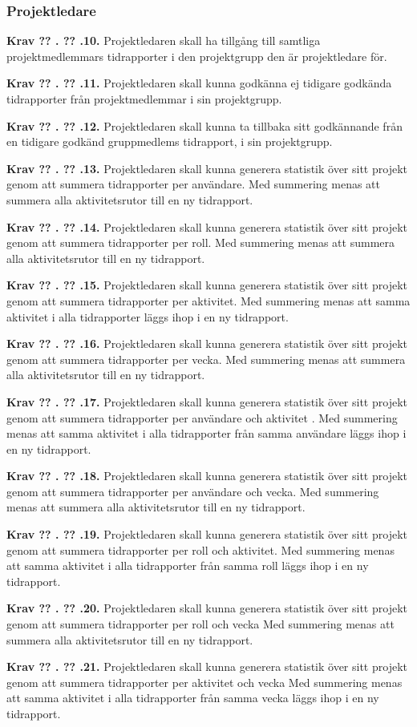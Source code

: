 \documentclass[a4paper]{article}
\newcommand\getcurrentref[1]{%
 \ifnumequal{\value{#1}}{0}
  {??}
  {\the\value{#1}}%
}
\newcommand\requirement[2]{
	\numberedrow{Krav}{#1}{#2}
}
\newcommand\numberedrow[3]{
	\noindent
	\textbf{#1 \getcurrentref{section}.\getcurrentref{subsection}.#2.} #3
	
}
\begin{document}
		\subsubsection*{Projektledare}
			\requirement{10}{Projektledaren skall ha tillgång till samtliga projektmedlemmars tidrapporter i den projektgrupp den är projektledare för.}
			\requirement{11}{Projektledaren skall kunna godkänna ej tidigare godkända tidrapporter från projektmedlemmar i sin projektgrupp.}
			\requirement{12}{Projektledaren skall kunna ta tillbaka sitt godkännande från en tidigare godkänd gruppmedlems tidrapport, i sin projektgrupp.}
			\requirement{13}{Projektledaren skall kunna generera statistik över sitt projekt genom att summera tidrapporter per användare. Med summering menas att summera alla aktivitetsrutor till en ny tidrapport.}
			\requirement{14}{Projektledaren skall kunna generera statistik över sitt projekt genom att summera tidrapporter per roll. Med summering menas att summera alla aktivitetsrutor till en ny tidrapport.}
			\requirement{15}{Projektledaren skall kunna generera statistik över sitt projekt genom att summera tidrapporter per aktivitet. Med summering menas att samma aktivitet i alla tidrapporter läggs ihop i en ny tidrapport.}
			\requirement{16}{Projektledaren skall kunna generera statistik över sitt projekt genom att summera tidrapporter per vecka. Med summering menas att summera alla aktivitetsrutor till en ny tidrapport.}
			\requirement{17}{Projektledaren skall kunna generera statistik över sitt projekt genom att summera tidrapporter per användare och aktivitet . Med summering menas att samma aktivitet i alla tidrapporter från samma användare läggs ihop i en ny tidrapport.}
			\requirement{18}{Projektledaren skall kunna generera statistik över sitt projekt genom att summera tidrapporter per användare och vecka. Med summering menas att summera alla aktivitetsrutor till en ny tidrapport.}
			\requirement{19}{Projektledaren skall kunna generera statistik över sitt projekt genom att summera tidrapporter per roll och aktivitet. Med summering menas att samma aktivitet i alla tidrapporter från samma roll läggs ihop i en ny tidrapport.}
			\requirement{20}{Projektledaren skall kunna generera statistik över sitt projekt genom att summera tidrapporter per roll och vecka Med summering menas att summera alla aktivitetsrutor till en ny tidrapport.}
			\requirement{21}{Projektledaren skall kunna generera statistik över sitt projekt genom att summera tidrapporter per aktivitet och vecka Med summering menas att samma aktivitet i alla tidrapporter från samma vecka läggs ihop i en ny tidrapport.}
\end{document}
